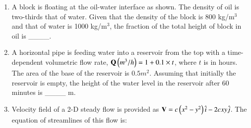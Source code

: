 \documentclass[journal,12pt,onecolumn]{IEEEtran}
\theoremstyle{remark}
\begin{document}
\begin{enumerate}
\begin{figure}[!ht]
	\label{fig:my_label}
\end{figure}


\item A block is floating at the oil-water interface as shown. The density of oil is two-thirds that of water. Given that the density of the block is 800 kg/m$^3$ and that of water is 1000 kg/m$^3$, the fraction of the total height of block in oil is \_\_\_\_.\\

\begin{figure}[!ht]
	\centering
	
	\label{fig:my_label}
\end{figure}

\item A horizontal pipe is feeding water into a reservoir from the top with a time-dependent volumetric flow rate, $\mathbf{Q}\left(m^{3}/h\right) = 1+0.1 \times t$, where $t$ is in hours. The area of the base of the reservoir is $0.5 m^2$. Assuming that initially the reservoir is empty, the height of the water level in the reservoir after 60 minutes is \_\_\_\_ m.\\

\item Velocity field of a 2-D steady flow is provided as $\mathbf{V} = c\left(x^2-y^2\right)\hat{i} - 2cxy\hat{j}$. The equation of streamlines of this flow is:

\begin{enumerate}
\end{enumerate}


\end{enumerate}
\end{document}
